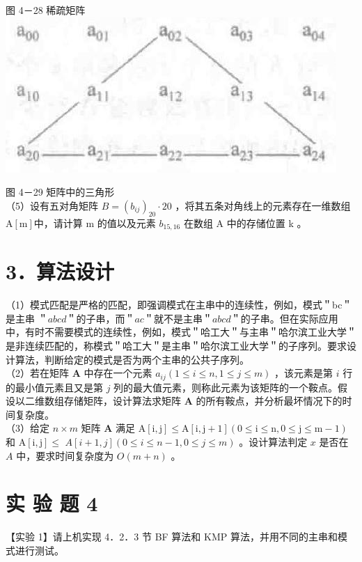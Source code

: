\documentclass[10pt]{article}
\begin{document}
图 4－28 稀疏矩阵\\
\includegraphics[max width=\textwidth, center]{2025_06_06_704745ea57b15b2333e5g-139}

图 4－29 矩阵中的三角形\\
（5）设有五对角矩阵 $B=\left(b_{i j}\right)_{20} \cdot 20$ ，将其五条对角线上的元素存在一维数组 $\mathrm{A}[\mathrm{m}]$中，请计算 m 的值以及元素 $b_{15,16}$ 在数组 A 中的存储位置 k 。

\section*{3．算法设计}
（1）模式匹配是严格的匹配，即强调模式在主串中的连续性，例如，模式＂bc＂是主串 ＂$a b c d$＂的子串，而＂$a c$＂就不是主串＂$a b c d$＂的子串。但在实际应用中，有时不需要模式的连续性，例如，模式＂哈工大＂与主串＂哈尔滨工业大学＂是非连续匹配的，称模式＂哈工大＂是主串＂哈尔滨工业大学＂的子序列。要求设计算法，判断给定的模式是否为两个主串的公共子序列。\\
（2）若在矩阵 $\boldsymbol{A}$ 中存在一个元素 $a_{i j}(1 \leqslant i \leqslant n, 1 \leqslant j \leqslant m)$ ，该元素是第 $i$ 行的最小值元素且又是第 $j$ 列的最大值元素，则称此元素为该矩阵的一个鞍点。假设以二维数组存储矩阵，设计算法求矩阵 $\boldsymbol{A}$ 的所有鞍点，并分析最坏情况下的时间复杂度。\\
（3）给定 $n \times m$ 矩阵 $\boldsymbol{A}$ 满足 $\mathrm{A}[\mathrm{i}, \mathrm{j}] \leqslant \mathrm{A}[\mathrm{i}, \mathrm{j}+1](0 \leqslant \mathrm{i} \leqslant \mathrm{n}, 0 \leqslant \mathrm{j} \leqslant \mathrm{m}-1)$ 和 $\mathrm{A}[\mathrm{i}, \mathrm{j}] \leqslant$ $A[i+1, j](0 \leqslant i \leqslant n-1,0 \leqslant j \leqslant m)$ 。设计算法判定 $x$ 是否在 $A$ 中，要求时间复杂度为 $O(m+n)$ 。

\section*{实 验 题 4}
【实验 1】请上机实现 4．2．3 节 BF 算法和 KMP 算法，并用不同的主串和模式进行测试。
\end{document}
